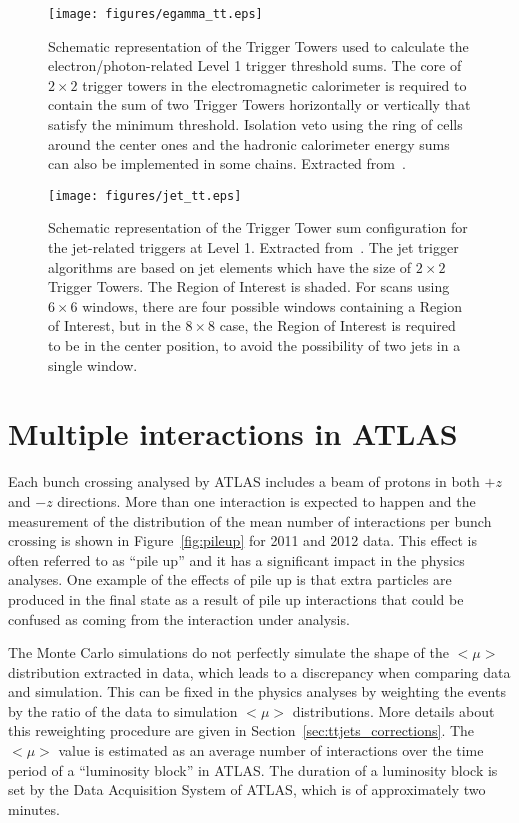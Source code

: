 \begin{figure}[tbpb]
\centering
\texttt{[image: figures/egamma\_tt.eps]}
\caption{Schematic representation of the Trigger Towers used to calculate the electron/photon-related Level 1 trigger threshold sums. The core of $2 \times 2$ trigger towers in the electromagnetic calorimeter is required to contain the sum of two Trigger Towers horizontally or vertically that satisfy the minimum threshold. Isolation veto using the ring of cells around the center ones and the hadronic calorimeter energy sums can also be implemented in some chains. Extracted from~\cite{detpaper}.}
\label{fig:l1egammatt}
\end{figure}

\begin{figure}[tbpb]
\centering
\texttt{[image: figures/jet\_tt.eps]}
\caption{Schematic representation of the Trigger Tower sum configuration for the jet-related triggers at Level 1. Extracted from~\cite{detpaper}. The jet trigger algorithms are based on jet elements which have the size of $2 \times 2$ Trigger Towers. The Region of Interest is shaded. For scans using $6 \times 6$ windows, there are four possible windows containing a Region of Interest, but in the $8 \times 8$ case, the Region of Interest is required to be in the center position, to avoid the possibility of two jets in a single window.}
\label{fig:l1jettt}
\end{figure}

\section{Multiple interactions in ATLAS}

Each bunch crossing analysed by ATLAS includes a beam of protons in both $+z$ and $-z$ directions. More than one interaction is expected to happen and the
measurement of the distribution of the mean number of interactions per bunch crossing is shown in Figure~\ref{fig:pileup} for 2011 and 2012 data. This effect is often referred to as
``pile up'' and it has a significant impact in the physics analyses.
One example of the effects of pile up is that extra particles are produced in the final state
as a result of pile up interactions that could be confused as coming from the interaction under analysis.

The Monte Carlo simulations do not perfectly simulate the shape of the $<\mu>$ distribution extracted in data, which leads to a discrepancy when comparing data and
simulation. This can be fixed in the physics analyses by weighting the events by the ratio of the data to simulation $<\mu>$ distributions. More details about this reweighting
procedure are given in Section~\ref{sec:ttjets_corrections}.
The $<\mu>$ value is estimated as an average number of
interactions over the
time period of a ``luminosity block'' in ATLAS. The duration of a
luminosity block is set by the Data Acquisition System of ATLAS, which
is of approximately two minutes.

